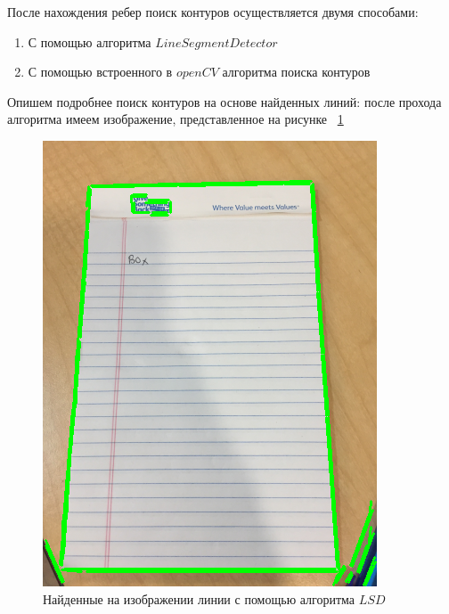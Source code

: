 После нахождения ребер поиск контуров осуществляется двумя способами:
\begin{enumerate}
    \item С помощью алгоритма $Line Segment Detector$ \cite{lsd}
    \item С помощью встроенного в $openCV$ алгоритма поиска контуров \cite{opencv_contours}
\end{enumerate}

Опишем подробнее поиск контуров на основе найденных линий: после прохода алгоритма имеем изображение, представленное на рисунке ~\ref{lsd_img}
\begin{figure}
    \includegraphics[scale=0.5]{img/perspective/lsd.png}
    \caption{Найденные на изображении линии с помощью алгоритма $LSD$}
    \label{lsd_img}
\end{figure}

